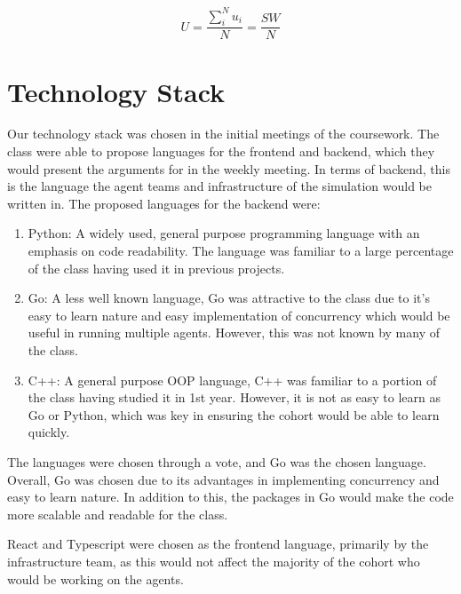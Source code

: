 \begin{equation}\label{utility_eq}
    \mathit{U}=\frac{\sum_i^N u_i}{N}=\frac{\mathit{SW}}{N}
\end{equation}

\section{Technology Stack}

Our technology stack was chosen in the initial meetings of the coursework. The class were able to propose languages for the frontend and backend, which they would present the arguments for in the weekly meeting. In terms of backend, this is the language the agent teams and infrastructure of the simulation would be written in. The proposed languages for the backend were:

\begin{enumerate}
    \item Python: A widely used, general purpose programming language with an emphasis on code readability. The language was familiar to a large percentage of the class having used it in previous projects. 
    \item Go: A less well known language, Go was attractive to the class due to it’s easy to learn nature and easy implementation of concurrency which would be useful in running multiple agents. However, this was not known by many of the class.
    \item C++: A general purpose OOP language, C++ was familiar to a portion of the class having studied it in 1st year. However, it is not as easy to learn as Go or Python, which was key in ensuring the cohort would be able to learn quickly. 
\end{enumerate}

The languages were chosen through a vote, and Go was the chosen language. Overall, Go was chosen due to its advantages in implementing concurrency and easy to learn nature. In addition to this, the packages in Go would make the code more scalable and readable for the class. 

React and Typescript were chosen as the frontend language, primarily by the infrastructure team, as this would not affect the majority of the cohort who would be working on the agents. 




